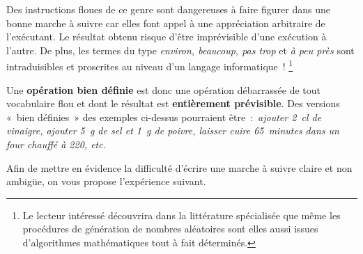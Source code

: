 		Des instructions floues de ce genre sont dangereuses à faire figurer
		dans une bonne marche à suivre car elles font appel à une appréciation
		arbitraire de l’exécutant. Le résultat obtenu risque
		d’être imprévisible d’une exécution à l’autre. De plus, les termes du
		type \textit{environ, beaucoup, pas trop} et \textit{à peu près} sont
		intraduisibles et proscrites au niveau d’un langage informatique~!
		\footnote{Le lecteur intéressé découvrira dans la littérature
		spécialisée que même les procédures de génération de nombres aléatoires
		sont elles aussi issues d’algorithmes mathématiques tout à fait
		déterminés.}
		
		Une \textbf{opération bien définie} est donc une opération débarrassée
		de tout vocabulaire flou et dont le résultat est \textbf{entièrement
		prévisible}. Des versions «~bien définies~» des exemples ci-dessus
		pourraient être~:~\textit{ajouter 2~cl de vinaigre, ajouter 5~g de sel
		et 1~g de poivre, laisser cuire 65~minutes dans un four chauffé à
		220\degre, etc.}

		Afin de mettre en évidence la difficulté d’écrire une
		marche à suivre claire et non ambigüe, on vous propose
		l’expérience suivant.

